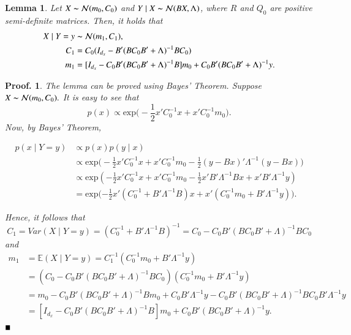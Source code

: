 \documentclass[
]{book}
\theoremstyle{break}
\newtheorem{lemma}{Lemma}
\theoremstyle{nonumberplain}
\newtheorem{proof*}{Proof.}
\begin{document}
\begin{lemma}\label{kalman-filter}
  Let $X\thicksim\mathcal N(m_0,C_0)$ and $Y\mid X\thicksim\mathcal N(BX,\Lambda)$, where $R$ and $Q_0$ are positive semi-definite matrices. 
  Then, it holds that
  \begin{align}
    X\mid Y=y&\thicksim\mathcal N(m_1,C_1),\\
    C_1&= C_0 (I_{d_x} - B'(B C_0 B'+ \Lambda)^{-1} B C_0) \\
    m_1&=[I_{d_x} - C_0 B'(B C_0 B'+ \Lambda)^{-1} B ]m_0 + C_0 B'(B C_0 B'+ \Lambda)^{-1}y.
  \end{align}
\end{lemma}
\begin{proof*}
   The lemma can be proved using Bayes' Theorem. Suppose $X\thicksim\mathcal N(m_0, C_0).$ It is easy to see that
\begin{equation} \label{normal-distrib-rewrite}
        p(x)\propto \text{exp}\Big(-\frac{1}{2}x'C_0^{-1}x + x'C_0^{-1}m_0\Big).
\end{equation}
Now, by Bayes' Theorem, 

    \begin{align*}
        p(x\mid Y=y)  &\propto p(x) p(y\mid x) \\
                    &\propto \text{exp}\Big(-\frac{1}{2}x' C_0^{-1}x + x' C_0^{-1}m_0-\frac{1}{2}(y-Bx)'\Lambda^{-1}(y-Bx)) \\
                    &\propto \text{exp}(-\frac{1}{2}x' C_0^{-1}x + x' C_0^{-1}m_0-\frac{1}{2}x' B' \Lambda^{-1}Bx+x' B' \Lambda^{-1}y)\\
                    &=\text{exp}(-\frac{1}{2}x'(C_0^{-1}+B' \Lambda^{-1}B)x+
                    x'(C_0^{-1}m_0+B' \Lambda^{-1}y)\Big).
    \end{align*}

Hence, it follows that 
\begin{equation*}
    C_1=Var(X\mid Y=y)= (C_0^{-1}+ B' \Lambda^{-1} B)^{-1}=C_0-C_0 B'(B C_0 B'+\Lambda)^{-1}B C_0
\end{equation*}
and 
\begin{equation*}
\begin{split}
        m_1 &=\mathbb E(X\mid Y=y) = C_1^{-1}(C_0^{-1}m_0+B' \Lambda^{-1}y)\\
            &= (C_0-C_0B'(B C_0B'+\Lambda)^{-1}B C_0)(C_0^{-1}m_0+B' \Lambda^{-1}y)\\
            &= m_0-C_0B'(B C_0B'+\Lambda)^{-1}B m_0 + C_0 B' \Lambda^{-1}y - C_0B'(B C_0B'+\Lambda)^{-1}B C_0 B' \Lambda^{-1}y \\
            &=[I_{d_x} - C_0 B'(B C_0 B'+ \Lambda)^{-1} B ]m_0 + C_0 B'(B C_0 B'+ \Lambda)^{-1}y.
\end{split}
\end{equation*}$\hfill\blacksquare$
\end{proof*}
\end{document}
